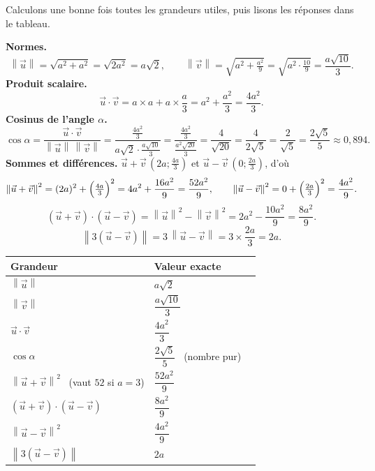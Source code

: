 \documentclass[11pt,a4paper]{article}
\providecommand{\norm}[1]{\left\lVert #1\right\rVert}
\begin{document}
\begin{exemple}
Calculons une bonne fois toutes les grandeurs utiles, puis lisons les réponses dans le tableau.

\textbf{Normes.}
\[
  \norm{\vec u}=\sqrt{a^2+a^2}=\sqrt{2a^2}=a\sqrt2,\qquad
  \norm{\vec v}=\sqrt{a^2+\tfrac{a^2}{9}}=\sqrt{a^2\cdot\tfrac{10}{9}}=\frac{a\sqrt{10}}{3}.
\]
\textbf{Produit scalaire.}
\[
  \vec u\cdot\vec v=a\times a+a\times\frac{a}{3}=a^2+\frac{a^2}{3}=\frac{4a^2}{3}.
\]
\textbf{Cosinus de l'angle $\alpha$.}
\[
  \cos\alpha=\frac{\vec u\cdot\vec v}{\norm{\vec u}\,\norm{\vec v}}
  =\frac{\tfrac{4a^2}{3}}{a\sqrt2\cdot\tfrac{a\sqrt{10}}{3}}
  =\frac{\tfrac{4a^2}{3}}{\tfrac{a^2\sqrt{20}}{3}}
  =\frac{4}{\sqrt{20}}=\frac{4}{2\sqrt5}=\frac{2}{\sqrt5}=\frac{2\sqrt5}{5}\approx0{,}894.
\]
\textbf{Sommes et différences.} $\vec u+\vec v\,(2a;\tfrac{4a}{3})$ et $\vec u-\vec v\,(0;\tfrac{2a}{3})$, d'où
\[
  \norm{\vec u+\vec v}^2=(2a)^2+\Bigl(\tfrac{4a}{3}\Bigr)^2=4a^2+\frac{16a^2}{9}=\frac{52a^2}{9},
  \qquad
  \norm{\vec u-\vec v}^2=0+\Bigl(\tfrac{2a}{3}\Bigr)^2=\frac{4a^2}{9}.
\]
\[
  (\vec u+\vec v)\cdot(\vec u-\vec v)=\norm{\vec u}^2-\norm{\vec v}^2=2a^2-\frac{10a^2}{9}=\frac{8a^2}{9}.
\]
\[
  \norm{3(\vec u-\vec v)}=3\,\norm{\vec u-\vec v}=3\times\frac{2a}{3}=2a.
\]

\begin{center}
\renewcommand{\arraystretch}{1.35}
\begin{tabular}{>{\raggedright\arraybackslash}m{6.7cm} >{\centering\arraybackslash}m{4.2cm} c}
\toprule
\rowcolor{primary!12}\textbf{Grandeur} & \textbf{Valeur exacte} & \\
\midrule
$\norm{\vec u}$ & $a\sqrt2$ & \\
$\norm{\vec v}$ & $\dfrac{a\sqrt{10}}{3}$ & \\
$\vec u\cdot\vec v$ & $\dfrac{4a^2}{3}$ & \\
$\cos\alpha$ & $\dfrac{2\sqrt5}{5}$ \ (nombre pur) & \\
$\norm{\vec u+\vec v}^2$ \ (vaut $52$ si $a=3$) & $\dfrac{52a^2}{9}$ & \\
$(\vec u+\vec v)\cdot(\vec u-\vec v)$ & $\dfrac{8a^2}{9}$ & \\
$\norm{\vec u-\vec v}^2$ & $\dfrac{4a^2}{9}$ & \\
$\norm{3(\vec u-\vec v)}$ & $2a$ & \\
\bottomrule
\end{tabular}
\end{center}


\end{exemple}
\end{document}
